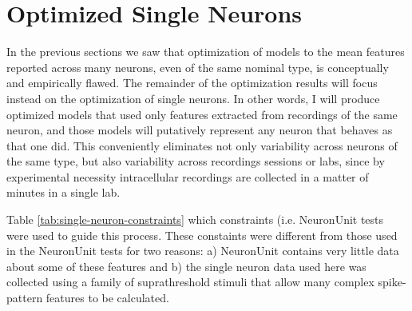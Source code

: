 \section{Optimized Single Neurons}
\label{sec:optimized-single-neurons}
In the previous sections we saw that optimization of models to the mean features reported across many neurons, even of the same nominal type, is conceptually and empirically flawed.
The remainder of the optimization results will focus instead on the optimization of single neurons.
In other words, I will produce optimized models that used only features extracted from recordings of the same neuron, and those models will putatively represent any neuron that behaves as that one did.
This conveniently eliminates not only variability across neurons of the same type, but also variability across recordings sessions or labs, since by experimental necessity intracellular recordings are collected in a matter of minutes in a single lab.

Table \ref{tab:single-neuron-constraints} which constraints (i.e. NeuronUnit tests were used to guide this process.  
These constaints were different from those used in the NeuronUnit tests for two reasons: a) NeuronUnit contains very little data about some of these features and b) the single neuron data used here was collected using a family of suprathreshold stimuli that allow many complex spike-pattern features to be calculated.

